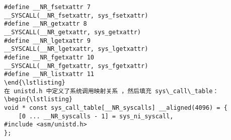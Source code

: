 \begin{lstlisting}
#define __NR_fsetxattr 7
__SYSCALL(__NR_fsetxattr, sys_fsetxattr)
#define __NR_getxattr 8
__SYSCALL(__NR_getxattr, sys_getxattr)
#define __NR_lgetxattr 9
__SYSCALL(__NR_lgetxattr, sys_lgetxattr)
#define __NR_fgetxattr 10
__SYSCALL(__NR_fgetxattr, sys_fgetxattr)
#define __NR_listxattr 11
\end{\lstlisting}
在 unistd.h 中定义了系统调用映射关系 ，然后填充 sys\_call\_table：
\begin{\lstlisting}
void * const sys_call_table[__NR_syscalls] __aligned(4096) = {
	[0 ... __NR_syscalls - 1] = sys_ni_syscall,
#include <asm/unistd.h>
};
\end{lstlisting}


